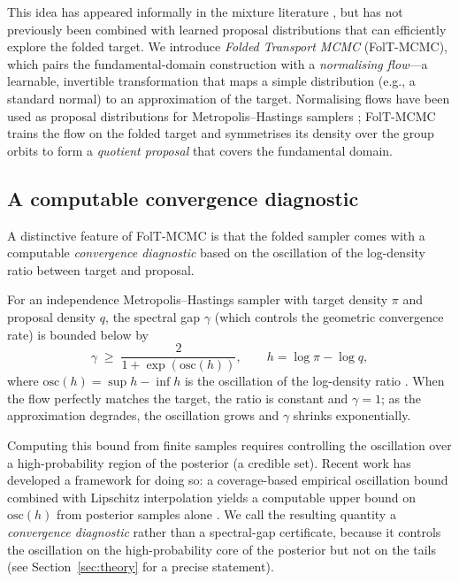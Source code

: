 This idea has appeared informally in the mixture literature
\citep{Celeux2000,FruhwirthSchnatter2001}, but has not previously
been combined with learned proposal distributions that can
efficiently explore the folded target.  We introduce
\emph{Folded Transport MCMC} (FolT-MCMC), which pairs the
fundamental-domain construction with a \emph{normalising flow}---a
learnable, invertible transformation that maps a simple
distribution (e.g., a standard normal) to an approximation of
the target.  Normalising flows have been used as proposal
distributions for Metropolis--Hastings samplers
\citep{Parno2018,Hoffman2019,Gabrie2022}; FolT-MCMC trains the
flow on the folded target and symmetrises its density over the
group orbits to form a \emph{quotient proposal} that covers
the fundamental domain.

\subsection{A computable convergence diagnostic}

A distinctive feature of FolT-MCMC is that the folded sampler
comes with a computable \emph{convergence diagnostic} based
on the oscillation of the log-density ratio between target and
proposal.

For an independence Metropolis--Hastings sampler with target
density $\pi$ and proposal density $q$, the spectral gap
$\gamma$ (which controls the geometric convergence rate) is
bounded below by
\[
  \gamma \;\geq\; \frac{2}{1 + \exp(\mathrm{osc}(h))},
  \qquad
  h = \log\pi - \log q,
\]
where $\mathrm{osc}(h) = \sup h - \inf h$ is the oscillation
of the log-density ratio \citep{MengersenTweedie1996}.
When the flow perfectly matches the target, the ratio is
constant and $\gamma = 1$; as the approximation degrades,
the oscillation grows and $\gamma$ shrinks exponentially.

Computing this bound from finite samples requires controlling
the oscillation over a high-probability region of the posterior
(a credible set).  Recent work has developed a
framework for doing so: a coverage-based empirical oscillation
bound combined with Lipschitz interpolation yields a computable
upper bound on $\mathrm{osc}(h)$ from posterior samples alone
\citep{LCNF,CerTMCMC}.  We call the resulting quantity a
\emph{convergence diagnostic} rather than a spectral-gap
certificate, because it controls the oscillation on the
high-probability core of the posterior but not on the tails
(see Section~\ref{sec:theory} for a precise statement).

